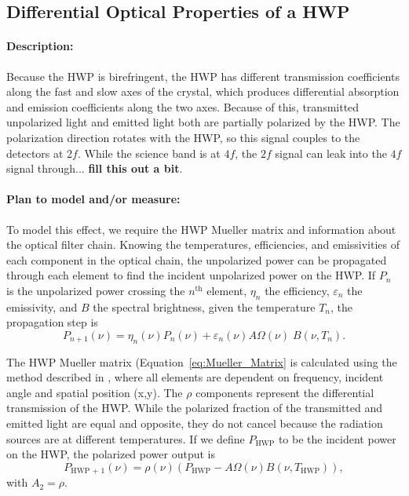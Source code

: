 
\subsection{Differential Optical Properties of a HWP}
\label{HWP Differential Optical Properties}

\paragraph{Description:}
Because the HWP is birefringent, the HWP has different transmission coefficients along the fast and slow axes of the crystal,
which produces differential absorption and emission coefficients along the two axes. Because of this, transmitted unpolarized light and emitted light both are partially polarized by the HWP. The polarization direction rotates with the HWP, so this signal couples to the detectors at 2$f$. While the science band is at $4f$, the $2f$ signal can leak into the $4f$ signal through... \textbf{fill this out a bit}.

\paragraph{Plan to model and/or measure:}
To model this effect, we require the HWP Mueller matrix and information about the optical filter chain. Knowing the temperatures, efficiencies, and emissivities of each component in the optical chain,
the unpolarized power can be propagated through each element to find the incident unpolarized power on the HWP.
If $P_n$ is the unpolarized power crossing the $n^\text{th}$ element, $\eta_n$ the efficiency, $\varepsilon_n$ the emissivity, and $B$ the spectral brightness, given the temperature $T_n$,
the propagation step is 
\begin{equation}
\label{unpolarized_propagation}
P_{n+1}(\nu) = \eta_n(\nu) P_n(\nu) + \varepsilon_n(\nu) A\Omega(\nu)\;  B(\nu, T_n) .
\end{equation}


The HWP Mueller matrix (Equation~\ref{eq:Mueller_Matrix} is calculated using the method described in \cite{Salatino16}, where all elements are dependent on frequency, incident angle and spatial position (x,y). The $\rho$ components represent the differential transmission of the HWP. While the polarized fraction of the transmitted and emitted light are equal and opposite, they do not cancel because the radiation sources are at different temperatures.
If we define $P_\text{HWP}$ to be the incident power on the HWP, the polarized power output is 
\begin{equation}
\label{eq:polarized_output}
P_\text{HWP + 1}(\nu) = \rho(\nu)(P_\text{HWP} - A\Omega(\nu)B(\nu, T_\text{HWP})),
\end{equation}
with $A_2 = \rho$. 

